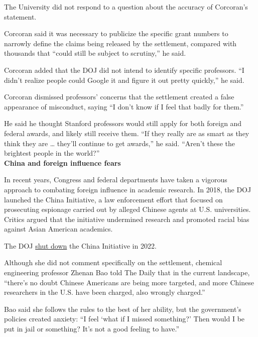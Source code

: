\documentclass{article}%
\begin{document}
\par{The University did not respond to a question about the accuracy of Corcoran’s statement.}\\
\par{Corcoran said it was necessary to publicize the specific grant numbers to narrowly define the claims being released by the settlement, compared with thousands that “could still be subject to scrutiny,” he said.}\\
\par{Corcoran added that the DOJ did not intend to identify specific professors. “I didn’t realize people could Google it and figure it out pretty quickly,” he said.}\\
\par{Corcoran dismissed professors’ concerns that the settlement created a false appearance of misconduct, saying “I don’t know if I feel that badly for them.”}\\
\par{He said he thought Stanford professors would still apply for both foreign and federal awards, and likely still receive them. “If they really are as smart as they think they are … they’ll continue to get awards,” he said. “Aren’t these the brightest people in the world?”}\\
\textbf{China and foreign influence fears}
\par{In recent years, Congress and federal departments have taken a vigorous approach to combating foreign influence in academic research. In 2018, the DOJ launched the China Initiative, a law enforcement effort that focused on prosecuting espionage carried out by alleged Chinese agents at U.S. universities. Critics argued that the initiative undermined research and promoted racial bias against Asian American academics.}\\
\par{The DOJ \href{https://www.npr.org/2022/02/23/1082593735/justice-department-china-initiative}{shut down} the China Initiative in 2022.}\\
\par{Although she did not comment specifically on the settlement, chemical engineering professor Zhenan Bao told The Daily that in the current landscape, “there’s no doubt Chinese Americans are being more targeted, and more Chinese researchers in the U.S. have been charged, also wrongly charged.” }\\
\par{Bao said she follows the rules to the best of her ability, but the government’s policies created anxiety: “I feel ‘what if I missed something?’ Then would I be put in jail or something? It’s not a good feeling to have.”}\\
\end{document}
